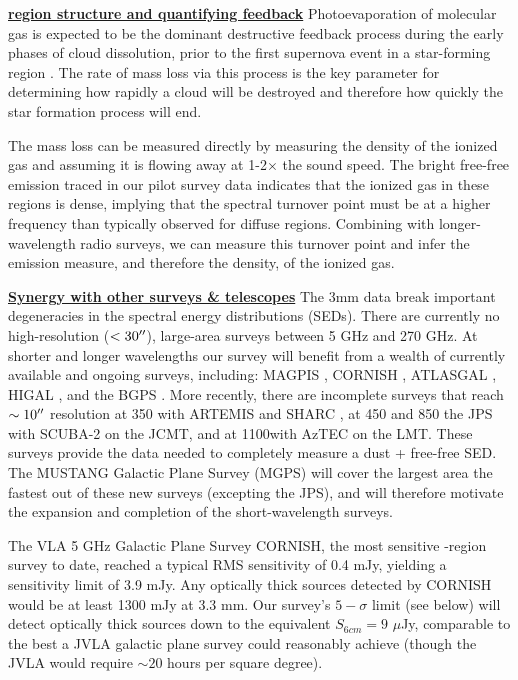 \documentclass[11pt,preprint]{aastex_nofoot}
\begin{document}
\indent\underline{\textbf{\helv \hii region structure and quantifying feedback}} 
Photoevaporation of molecular gas is expected to be the dominant
destructive feedback process during the early phases of cloud dissolution,
prior to the first supernova event in a star-forming region \citep{Matzner2015a}.
The rate of mass loss via this process is the key parameter for determining
how rapidly a cloud will be destroyed and therefore how quickly the star
formation process will end. 

The mass loss can be measured directly by measuring the density of the ionized
gas and assuming it is flowing away at 1-2$\times$ the sound speed.  The bright
free-free emission traced in our pilot survey data indicates that the ionized
gas in these regions is dense, implying that the spectral turnover point must
be at a higher frequency than typically observed for diffuse \hii regions.
Combining \MUSTANG with longer-wavelength radio surveys, we can measure this
turnover point and infer the emission measure, and therefore the density, of
the ionized gas.







\indent\underline{\textbf{\helv Synergy with other surveys \& telescopes}} 
The 3mm data break important degeneracies in the spectral energy distributions
(SEDs). There are currently no high-resolution ($<30\mbox{$^{\prime\prime}$}$), large-area
surveys between 5 GHz and 270 GHz.  At shorter and longer wavelengths our
survey will benefit from a wealth of currently available and ongoing surveys,
including: MAGPIS \citep{Helfand2006a}, CORNISH \citep{Hoare2012a}, ATLASGAL
\citep{Schuller2009a},  HIGAL \citep{Molinari2010a}, and the BGPS
\citep[][]{Aguirre2011a,Ginsburg2013a}.  More recently, there are incomplete
surveys that reach $\sim10\mbox{$^{\prime\prime}$}$ resolution at 350 \um with ARTEMIS and SHARC
\citep[e.g.][]{Lin2016a}, at 450 and 850 \um the JPS with SCUBA-2 on the JCMT,
and at 1100\um with AzTEC on the LMT. These surveys provide the data needed to
completely measure a dust + free-free SED.  The MUSTANG Galactic Plane Survey
(MGPS) will cover the largest area the fastest out of these new surveys
(excepting the JPS), and will therefore motivate the expansion and completion
of the short-wavelength surveys.

The VLA 5 GHz Galactic Plane Survey CORNISH, the most sensitive \uchii-region
survey to date, reached a typical RMS sensitivity of 0.4 mJy, yielding a
sensitivity limit of 3.9 mJy.  Any optically thick sources detected by CORNISH
would be at least 1300 mJy at 3.3 mm.  Our survey's $5-\sigma$ limit (see
below) will  detect optically thick sources down to the equivalent
$S_{6cm} = 9$ $\mu$Jy, comparable to the best a JVLA galactic plane survey
could reasonably achieve
(though the JVLA would require $\sim20$ hours per square degree).
\end{document}
